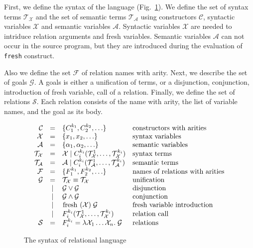 First, we define the syntax of the language (Fig.~\ref{fair:syntax}). We define the set of syntax terms $\mathcal{T}_\mathcal{X}$ and the set of semantic terms
$\mathcal{T}_\mathcal{A}$ using constructors $\mathcal{C}$, syntactic variables $\mathcal{X}$ and semantic variables $\mathcal{A}$. Syntactic variables $\mathcal{X}$
are needed to intriduce relation arguments and fresh variables. Semantic variables $\mathcal{A}$ can not occur in the source program, but they are introduced during
the evaluation of  \lstinline{fresh} construct.

Also we define the set $\mathcal{F}$ of relation names with arity. Next, we describe the set of goals $\mathcal{G}$. A goals is either a unification of terms, or a disjunction, conjunction, introduction
of fresh variable, call of a relation. Finally, we define the set of relations $\mathcal{S}$. Each relation consists of the name with arity, the list of variable names,
and the goal as its body.

\begin{figure}[h]
\[
  \begin{array}{rcll}
     \mathcal{C} & = & \{ C_1^{k_1}, C_2^{k_2}, \ldots \} 
     & \mbox{constructors with arities} 
     \\
     \mathcal{X} & = & \{x_1, x_2, \ldots \} 
     & \mbox{syntax variables} 
     \\
     \mathcal{A} & = & \{\alpha_1, \alpha_2, \ldots \} 
     & \mbox{semantic variables} 
     \\
     \mathcal{T}_\mathcal{X} & = & \mathcal{X} \mid C_i^{k_i}(\mathcal{T}_\mathcal{X}^1, \ldots, \mathcal{T}_\mathcal{X}^{k_i})
     & \mbox{syntax terms} 
     \\
     \mathcal{T}_\mathcal{A} & = & \mathcal{A} \mid C_i^{k_i}(\mathcal{T}_\mathcal{A}^1, \ldots, \mathcal{T}_\mathcal{A}^{k_i})
     & \mbox{semantic terms} 
     \\
     \mathcal{F} & = & \{F_1^{k_1}, F_2^{k_2}, \ldots \} 
     & \mbox{names of relations with arities} 
     \\
     \mathcal{G} & =    & \mathcal{T}_\mathcal{X} \equiv \mathcal{T}_\mathcal{X} & \mbox{unification} \\
                 & \mid & \mathcal{G} \lor \mathcal{G} & \mbox{disjunction} \\
                 & \mid & \mathcal{G} \land \mathcal{G} & \mbox{conjunction} \\
                 & \mid & \mbox{\lstinline|fresh|} \; (\mathcal{X}) \; \mathcal{G} & \mbox{fresh variable introduction} \\
                 & \mid &  F_i^{k_i}(\mathcal{T}_\mathcal{X}^1, \ldots, \mathcal{T}_\mathcal{X}^{k_i}) & \mbox{relation call} \\
    \mathcal{S} & = &F_i^{k_i} = \lambda \mathcal{X}_1 \ldots \mathcal{X}_n. \; \mathcal{G} & \mbox{relations}
  \end{array}
\]
    \caption{The syntax of relational language}
    \label{fair:syntax}
\end{figure}

